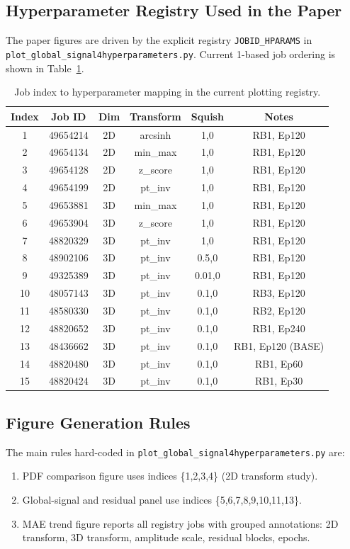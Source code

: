 \documentclass{aastex631}
\begin{document}
\subsection{Hyperparameter Registry Used in the Paper}
The paper figures are driven by the explicit registry \texttt{JOBID\_HPARAMS} in \texttt{plot\_global\_signal4hyperparameters.py}. Current 1-based job ordering is shown in Table~\ref{tab:job_registry}.

\begin{table}[t]
\centering
\caption{Job index to hyperparameter mapping in the current plotting registry.}
\label{tab:job_registry}
\begin{tabular}{cccccc}
\toprule
Index & Job ID & Dim & Transform & Squish & Notes \\
\midrule
1 & 49654214 & 2D & arcsinh & 1,0 & RB1, Ep120 \\
2 & 49654134 & 2D & min\_max & 1,0 & RB1, Ep120 \\
3 & 49654128 & 2D & z\_score & 1,0 & RB1, Ep120 \\
4 & 49654199 & 2D & pt\_inv & 1,0 & RB1, Ep120 \\
5 & 49653881 & 3D & min\_max & 1,0 & RB1, Ep120 \\
6 & 49653904 & 3D & z\_score & 1,0 & RB1, Ep120 \\
7 & 48820329 & 3D & pt\_inv & 1,0 & RB1, Ep120 \\
8 & 48902106 & 3D & pt\_inv & 0.5,0 & RB1, Ep120 \\
9 & 49325389 & 3D & pt\_inv & 0.01,0 & RB1, Ep120 \\
10 & 48057143 & 3D & pt\_inv & 0.1,0 & RB3, Ep120 \\
11 & 48580330 & 3D & pt\_inv & 0.1,0 & RB2, Ep120 \\
12 & 48820652 & 3D & pt\_inv & 0.1,0 & RB1, Ep240 \\
13 & 48436662 & 3D & pt\_inv & 0.1,0 & RB1, Ep120 (BASE) \\
14 & 48820480 & 3D & pt\_inv & 0.1,0 & RB1, Ep60 \\
15 & 48820424 & 3D & pt\_inv & 0.1,0 & RB1, Ep30 \\
\bottomrule
\end{tabular}
\end{table}

\subsection{Figure Generation Rules}
The main rules hard-coded in \texttt{plot\_global\_signal4hyperparameters.py} are:
\begin{enumerate}
    \item PDF comparison figure uses indices \{1,2,3,4\} (2D transform study).
    \item Global-signal and residual panel use indices \{5,6,7,8,9,10,11,13\}.
    \item MAE trend figure reports all registry jobs with grouped annotations:
    2D transform, 3D transform, amplitude scale, residual blocks, epochs.
\end{enumerate}
\end{document}
